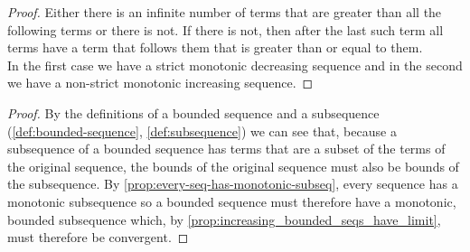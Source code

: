 \documentclass[../MathsNotesBase.tex]{subfiles}
\begin{document}
{		\bigskip
		\begin{proof}
			Either there is an infinite number of terms that are greater than all the following terms or there is not. If there is not, then after the last such term all terms have a term that follows them that is greater than or equal to them.\\
			In the first case we have a strict monotonic decreasing sequence and in the second we have a non-strict monotonic increasing sequence.
		\end{proof}
	
		\begin{proof}
			By the definitions of a bounded sequence and a subsequence (\ref{def:bounded-sequence}, \ref{def:subsequence}) we can see that, because a subsequence of a bounded sequence has terms that are a subset of the terms of the original sequence, the bounds of the original sequence must also be bounds of the subsequence. By \autoref{prop:every-seq-has-monotonic-subseq}, every sequence has a monotonic subsequence so a bounded sequence must therefore have a monotonic, bounded subsequence which, by \autoref{prop:increasing_bounded_seqs_have_limit}, must therefore be convergent.
		\end{proof}



}
\end{document}
